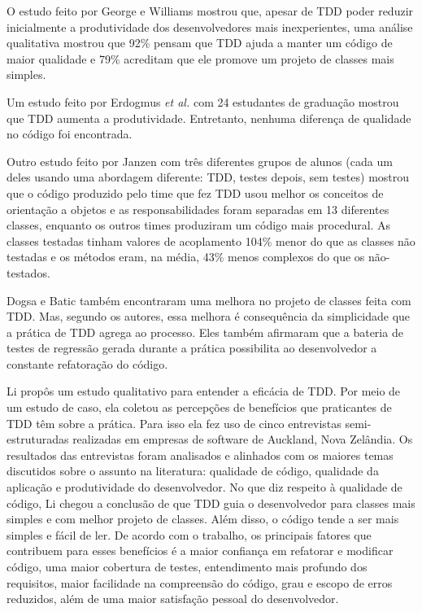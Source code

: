 \documentclass[conference]{IEEEtran}
\begin{document}
O estudo feito por George e Williams \cite{george-e-williams} mostrou que,
apesar de TDD poder reduzir inicialmente a produtividade dos desenvolvedores 
mais inexperientes, uma análise
qualitativa mostrou que 92\% pensam que TDD ajuda a manter um
código de maior qualidade e 79\% acreditam que ele promove um projeto 
de classes mais simples.

Um estudo feito por Erdogmus \textit{et al.} \cite{erdogmus-morisio} com 24 estudantes de
graduação mostrou que TDD aumenta a produtividade. Entretanto, nenhuma diferença 
de qualidade no código foi encontrada.

Outro estudo feito por Janzen \cite{janzen-saiedian} com três diferentes grupos
de alunos (cada um deles usando uma abordagem diferente: TDD, testes depois, sem
testes) mostrou que o código produzido pelo time que fez TDD usou melhor os
conceitos de orientação a objetos e as responsabilidades foram separadas em 13 
diferentes classes, enquanto os outros times produziram um código mais
procedural. 
As classes testadas tinham valores de acoplamento 104\% menor do 
que as classes não testadas e os métodos eram, na média, 43\% menos complexos 
do que os não-testados.

Dogsa e Batic \cite{dogsa-batic} também encontraram uma melhora no
projeto de classes feita com TDD. Mas, segundo os autores, essa melhora é 
consequência da simplicidade que a prática de TDD agrega ao processo. Eles
também  afirmaram que a bateria de testes de regressão gerada durante a prática 
possibilita ao desenvolvedor a constante refatoração do código.

Li \cite{angela-li} propôs um estudo qualitativo para
entender a eficácia de TDD. Por meio de um estudo de caso, ela coletou as 
percepções de benefícios que praticantes de TDD têm sobre a prática. Para isso ela
fez uso de cinco entrevistas semi-estruturadas realizadas em empresas de software de 
Auckland, Nova Zelândia. Os resultados das entrevistas foram analisados e alinhados
com os maiores temas discutidos sobre o assunto na literatura: qualidade de código,
qualidade da aplicação e produtividade do desenvolvedor.
No que diz respeito à qualidade de código, Li chegou a conclusão de
que TDD guia o desenvolvedor para classes mais simples e com melhor projeto de classes. 
Além disso, o código tende a ser mais simples e fácil de ler.
De acordo com o trabalho, os principais fatores que contribuem para esses benefícios
é a maior confiança em refatorar e modificar código, uma maior cobertura de testes,
entendimento mais profundo dos requisitos, maior facilidade na compreensão do código,
grau e escopo de erros reduzidos, além de uma maior satisfação pessoal do desenvolvedor.
\end{document}

